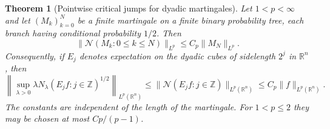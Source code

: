 \documentclass[11pt]{article}
\numberwithin{equation}{section}
\newtheorem{theorem}{Theorem}[section]
\theoremstyle{remark}
\theoremstyle{definition}
\begin{document}
\begin{theorem}[Pointwise critical jumps for dyadic martingales]
\label{mod:martingale-pointwise}
Let $1<p<\infty$ and let $(M_k)_{k=0}^N$ be a finite martingale on a
finite binary probability tree, each branch having conditional
probability $1/2$. Then
\begin{equation}\label{mod:binary-jump}
 \|\mathcal N(M_k:0\le k\le N)\|_{L^p}
 \le C_p\|M_N\|_{L^p}.
\end{equation}
Consequently, if $E_j$ denotes expectation on the dyadic cubes of
sidelength $2^j$ in $\mathbb R^n$, then
\begin{equation}\label{mod:dyadic-pointwise-jump}
 \left\|\sup_{\lambda>0}\lambda
     N_\lambda(E_jf:j\in\mathbb Z)^{1/2}\right\|_{L^p(\mathbb R^n)}
 \le\|\mathcal N(E_jf:j\in\mathbb Z)\|_{L^p(\mathbb R^n)}
 \le C_p\|f\|_{L^p(\mathbb R^n)}.
\end{equation}
The constants are independent of the length of the martingale.
For $1<p\le2$ they may be chosen at most $C p/(p-1)$.
\end{theorem}
\end{document}
